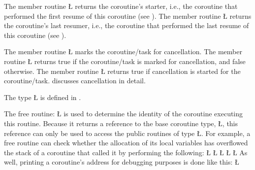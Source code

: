 \documentclass[openright,twoside]{report}
\begin{document}
The member routine \LGinlinetrue\LGbegin\lgrinde\L{}\endlgrinde\LGend{} returns the coroutine's starter, i.e., the coroutine that performed the first resume of this coroutine (see ).
The member routine \LGinlinetrue\LGbegin\lgrinde\L{}\endlgrinde\LGend{} returns the coroutine's last resumer, i.e., the coroutine that performed the last resume of this coroutine (see ).

The member routine \LGinlinetrue\LGbegin\lgrinde\L{}\endlgrinde\LGend{} marks the coroutine/task for cancellation.
The member routine \LGinlinetrue\LGbegin\lgrinde\L{}\endlgrinde\LGend{} returns true if the coroutine/task is marked for cancellation, and false otherwise.
The member routine \LGinlinetrue\LGbegin\lgrinde\L{}\endlgrinde\LGend{} returns true if cancellation is started for the coroutine/task.
 discusses cancellation in detail.

The type \LGinlinetrue\LGbegin\lgrinde\L{}\endlgrinde\LGend{} is defined in .

The free routine:
\LGinlinefalse\LGbegin\lgrinde
\L{}
\endlgrinde\LGend
{}%
is used to determine the identity of the coroutine executing this routine.
Because it returns a reference to the base coroutine type, \LGinlinetrue\LGbegin\lgrinde\L{}\endlgrinde\LGend{}, this reference can only be used to access the public routines of type \LGinlinetrue\LGbegin\lgrinde\L{}\endlgrinde\LGend{}.
For example, a free routine can check whether the allocation of its local variables has overflowed the stack of a coroutine that called it by performing the following:
\LGinlinefalse\LGbegin\lgrinde
\L{}
\L{\LB{}}
\CE{}\L{\LB{}}
\CE{}\L{\LB{}}
\CE{}\L{\LB{\}}}
\endlgrinde\LGend
As well, printing a coroutine's address for debugging purposes is done like this:
\LGinlinefalse\LGbegin\lgrinde
\L{}
\CE{}\endlgrinde\LGend
\end{document}
